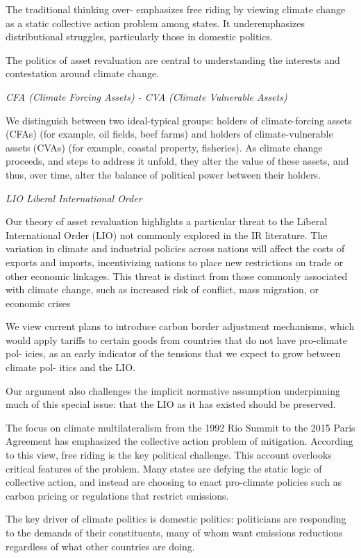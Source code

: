 \documentclass[
]{book}
\begin{document}
The traditional thinking over-
emphasizes free riding by viewing climate change as a static collective action
problem among states.
It underemphasizes distributional struggles, particularly
those in domestic politics.

The politics of asset revaluation are central to understanding the interests
and contestation around climate change.

\emph{CFA (Climate Forcing Assets) - CVA (Climate Vulnerable Assets)}

We distinguish between two ideal-typical groups: holders of climate-forcing assets
(CFAs) (for example, oil fields, beef farms) and holders of climate-vulnerable assets
(CVAs) (for example, coastal property, fisheries). As climate change proceeds, and
steps to address it unfold, they alter the value of these assets, and thus, over time,
alter the balance of political power between their holders.

\emph{LIO Liberal International Order}

Our theory of asset revaluation highlights a particular threat to the Liberal
International Order (LIO) not commonly explored in the IR literature. The variation
in climate and industrial policies across nations will affect the costs of exports and
imports, incentivizing nations to place new restrictions on trade or other economic
linkages. This threat is distinct from those commonly associated with climate
change, such as increased risk of conflict, mass migration, or economic crises

We view current plans to introduce carbon border adjustment mechanisms, which
would apply tariffs to certain goods from countries that do not have pro-climate pol-
icies, as an early indicator of the tensions that we expect to grow between climate pol-
itics and the LIO.

Our argument also challenges the implicit normative assumption underpinning
much of this special issue: that the LIO as it has existed should be preserved.

The focus on climate multilateralism from the 1992 Rio Summit to the 2015 Paris
Agreement has emphasized the collective action problem of mitigation. According to
this view, free riding is the key political challenge. This account overlooks critical
features of the problem.
Many states are defying the static logic of collective
action, and instead are choosing to enact pro-climate policies such as carbon
pricing or regulations that restrict emissions.

The key driver of climate politics is domestic politics:
politicians are responding to the demands of their constituents,
many of whom want emissions reductions regardless of what other countries
are doing.
\end{document}
